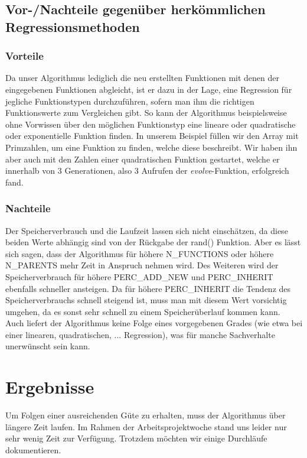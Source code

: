 \documentclass[a4paper,12pt]{article}
\begin{document}
\subsection{Vor-/Nachteile gegenüber herkömmlichen Regressionsmethoden}
\subsubsection{Vorteile}
Da unser Algorithmus lediglich die neu erstellten Funktionen mit denen der eingegebenen Funktionen abgleicht, ist er dazu in der Lage, eine Regression für jegliche Funktionstypen durchzuführen, sofern man ihm die richtigen Funktionswerte zum Vergleichen gibt. So kann der Algorithmus beispielsweise ohne Vorwissen über den möglichen Funktionstyp eine lineare oder quadratische oder exponentielle Funktion finden. In unserem Beispiel füllen wir den Array mit Primzahlen, um eine Funktion zu finden, welche diese beschreibt. Wir haben ihn aber auch mit den Zahlen einer quadratischen Funktion gestartet, welche er innerhalb von 3 Generationen, also 3 Aufrufen der \emph{evolve}-Funktion, erfolgreich fand. \\

\subsubsection{Nachteile}
Der Speicherverbrauch und die Laufzeit lassen sich nicht einschätzen, da diese beiden Werte abhängig sind von der Rückgabe der rand() Funktion. Aber es lässt sich sagen, dass der Algorithmus für höhere N\_FUNCTIONS oder höhere N\_PARENTS mehr Zeit in Anspruch nehmen wird. Des Weiteren wird der Speicherverbrauch für höhere PERC\_ADD\_NEW und PERC\_INHERIT ebenfalls schneller ansteigen. Da für höhere PERC\_INHERIT die Tendenz des Speicherverbrauchs schnell steigend ist, muss man mit diesem Wert vorsichtig umgehen, da es sonst sehr schnell zu einem Speicherüberlauf kommen kann.\\
Auch liefert der Algorithmus keine Folge eines vorgegebenen Grades (wie etwa bei einer linearen, quadratischen, ... Regression), was für manche Sachverhalte unerwünscht sein kann.
\newpage

\section{Ergebnisse}
Um Folgen einer ausreichenden Güte zu erhalten, muss der Algorithmus über längere Zeit laufen. Im Rahmen der Arbeitsprojektwoche stand uns leider nur sehr wenig Zeit zur Verfügung. Trotzdem möchten wir einige Durchläufe dokumentieren.\\
\newpage
\end{document}
